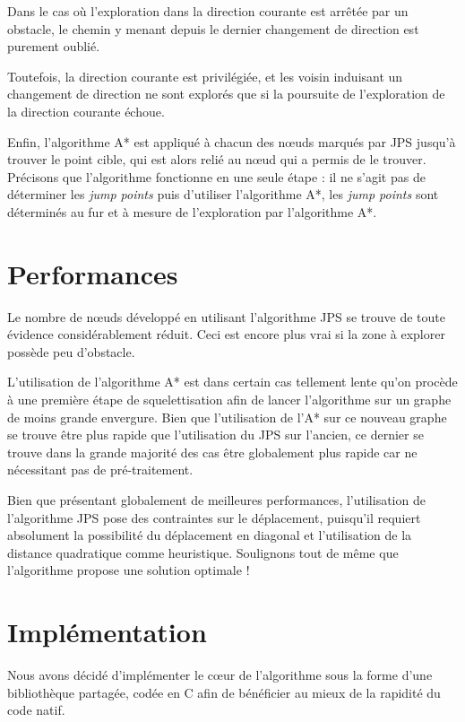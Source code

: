 \documentclass[a4paper,11pt]{article}
\begin{document}
\begin{description}
Dans le cas où l'exploration dans la direction courante est arrêtée par un
obstacle, le chemin y menant depuis le dernier 
changement de direction est purement oublié.

Toutefois, la direction courante est privilégiée, et les voisin induisant un
changement de direction ne sont explorés que si
la poursuite de l'exploration de la direction courante échoue.
\end{description}

Enfin, l'algorithme A* est appliqué à chacun des nœuds marqués par JPS jusqu'à
trouver le point cible, qui est alors relié au 
nœud qui a permis de le trouver. Précisons que l'algorithme fonctionne en une
seule étape : il ne s’agit pas de déterminer les \emph{jump points} puis
d’utiliser l'algorithme A*, les \emph{jump points} sont déterminés au fur et à
mesure de l’exploration par l'algorithme A*.

\section{Performances}
Le nombre de nœuds développé en utilisant l'algorithme JPS se trouve
de toute évidence considérablement réduit. Ceci est encore plus vrai si la zone
à explorer possède peu d’obstacle.

L’utilisation de l’algorithme A* est dans certain cas tellement lente qu’on
procède à une première étape de squelettisation afin de lancer l’algorithme sur
un graphe de moins grande envergure. Bien que l’utilisation de l’A* sur ce
nouveau graphe se trouve être plus rapide que l’utilisation du JPS sur
l’ancien, ce dernier se trouve dans la grande majorité des cas être globalement
plus rapide car ne nécessitant pas de pré-traitement.

Bien que présentant globalement de meilleures performances, l'utilisation de
l'algorithme JPS pose des contraintes sur le déplacement, puisqu'il requiert
absolument la possibilité du déplacement en diagonal et l'utilisation de la
distance quadratique comme heuristique. Soulignons tout de même
que l'algorithme propose une solution optimale !

\section{Implémentation}
Nous avons décidé d'implémenter le cœur de l'algorithme sous la forme d’une
bibliothèque partagée, codée en C afin de bénéficier
au mieux de la rapidité du code natif.
\end{document}
